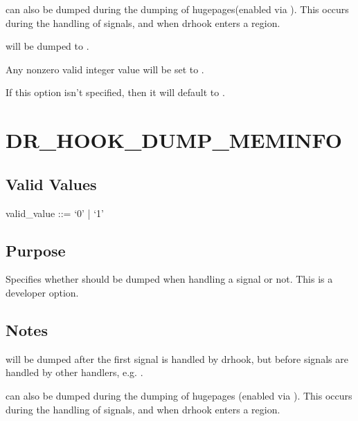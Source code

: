 \documentclass[letterpaper,10pt,english]{sphinxmanual}
\begin{document}
\sphinxAtStartPar
{} can also be dumped during the dumping of hugepages(enabled via {\hyperref[\detokenize{flag/flag:dr-hook-dump-hugepages}]{}}). This occurs during the handling of signals, and when drhook enters a region.

\sphinxAtStartPar
{} will be dumped to .

\sphinxAtStartPar
Any non\sphinxhyphen{}zero valid integer value will be set to .

\sphinxAtStartPar
If this option isn’t specified, then it will default to .


\section{DR\_HOOK\_DUMP\_MEMINFO}
\label{\detokenize{flag/flag:dr-hook-dump-meminfo}}\label{\detokenize{flag/flag:id202}}

\subsection{Valid Values}
\label{\detokenize{flag/flag:id203}}
\begin{DUlineblock}{0em}
\item[] valid\_value ::= ‘0’ | ‘1’
\end{DUlineblock}


\subsection{Purpose}
\label{\detokenize{flag/flag:id204}}
\sphinxAtStartPar
Specifies whether  should be dumped when handling a signal or not. This is a developer option.


\subsection{Notes}
\label{\detokenize{flag/flag:id205}}
\sphinxAtStartPar
{} will be dumped after the first signal is handled by drhook, but before signals are handled by other handlers, e.g. .

\sphinxAtStartPar
{} can also be dumped during the dumping of hugepages (enabled via {\hyperref[\detokenize{flag/flag:dr-hook-dump-hugepages}]{}}). This occurs during the handling of signals, and when drhook enters a region.
\end{document}

